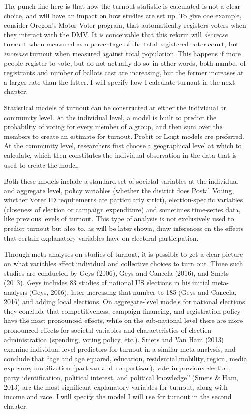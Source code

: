 \documentclass[12pt,twoside]{reedthesis}
\begin{document}
  The punch line here is that how the turnout statistic is calculated is
  not a clear choice, and will have an impact on how studies are set up.
  To give one example, consider Oregon's Motor Voter program, that
  automatically registers voters when they interact with the DMV. It is
  conceivable that this reform will \emph{decrease} turnout when measured
  as a percentage of the total registered voter count, but \emph{increase}
  turnout when measured against total population. This happens if more
  people register to vote, but do not actually do so--in other words, both
  number of registrants and number of ballots cast are increasing, but the
  former increases at a larger rate than the latter. I will specify how I
  calculate turnout in the next chapter.
  
  Statistical models of turnout can be constructed at either the
  individual or community level. At the individual level, a model is built
  to predict the probability of voting for every member of a group, and
  then sum over the members to create an estimate for turnout. Probit or
  Logit models are preferred. At the community level, researchers first
  choose a geographical level at which to calculate, which then
  constitutes the individual observation in the data that is used to
  create the model.
  
  Both these models include a standard set of societal variables at the
  individual and aggregate level, policy variables (whether the district
  does Postal Voting, whether Voter ID requirements are particularly
  strict), election-specific variables (closeness of election or campaign
  expenditure) and sometimes time-series data, like previous levels of
  turnout. This type of analysis is not exclusively used to predict
  turnout but also to, as will be later shown, draw inferences on the
  effects that certain explanatory variables have on electoral
  participation.
  
  Through meta-analyses on studies of turnout, it is possible to get a
  clear picture on what variables effect individual and collective choices
  to turn out. Three such studies are conducted by Geys (2006), Geys and
  Cancela (2016), and Smets (2013). Geys includes 83 studies of national
  US elections in his initial meta-analysis (Geys, 2006), later increasing
  that number to 185 (Geys and Cancela, 2016) and adding local elections.
  On aggregate-level models for national elections they conclude that
  competitiveness, campaign financing, and registration policy have the
  most pronounced effects, while on the sub-national level there are more
  pronounced effects for societal variables and characteristics of
  election administration (spending, voting policy, etc.). Smets and Van
  Ham (2013) examine individual-level predictors for turnout in a similar
  meta-analysis, and conclude that ``age and age squared, education,
  residential mobility, region, media exposure, mobilization (partisan and
  nonpartisan), vote in previous election, party identification, political
  interest, and political knowledge'' (Smets \& Ham, 2013) are the most
  significant explanatory variables for turnout, along with income and
  race. I will specify the model I will use for turnout in the second
  chapter.
  
\end{document}
